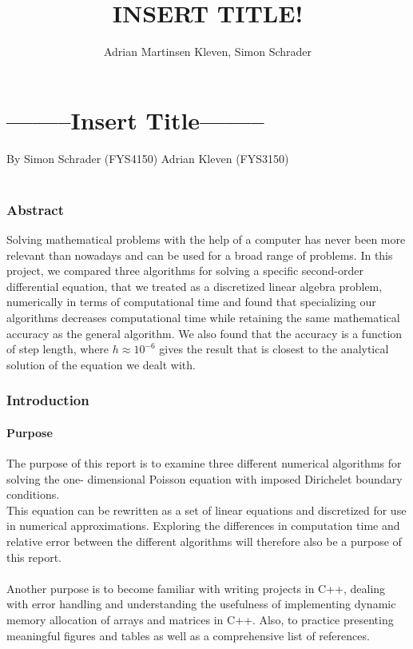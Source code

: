 \documentclass[10pt,a4paper]{article}
\author{Adrian Martinsen Kleven, Simon Schrader}
\title{INSERT TITLE!}
\begin{document}
\part*{--------Insert Title--------}
{\large By Simon Schrader (FYS4150) Adrian Kleven (FYS3150)}\\\\
\tableofcontents

\listoffigures
\listoftables

 
\clearpage
 
\section{Abstract}
Solving mathematical problems with the help of a computer has never been more relevant than nowadays and can be used for a broad range of problems. In this project, we compared three algorithms for solving a specific second-order differential equation, that we treated as a discretized linear algebra problem, numerically in terms of computational time and found that specializing our algorithms decreases computational time while retaining the same mathematical accuracy as the general algorithm. We also found that the accuracy is a function of step length, where  $h \approx 10^{-6}$ gives the result that is closest to the analytical solution of the equation we dealt with.
\section{Introduction}
\subsection{Purpose} 
The purpose of this report is to examine three different numerical algorithms for solving the one- dimensional Poisson equation with imposed Dirichelet boundary conditions. \\This equation can be rewritten as a set of linear equations and discretized for use in numerical approximations. Exploring the differences in computation time and relative error between the different algorithms will therefore also be a purpose of this report.\\\\
Another purpose is to become familiar with writing projects in C++, dealing with error handling and understanding the usefulness of implementing dynamic memory allocation of arrays and matrices in C++. Also, to practice presenting meaningful figures and tables as well as a comprehensive list of references.
\end{document}
